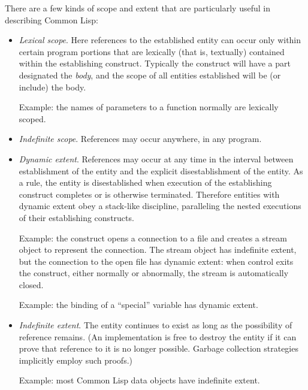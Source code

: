 There are a few kinds of scope and extent that are particularly useful
in describing Common Lisp:
\begin{itemize}
\item
{\it Lexical scope}.  Here references to the established
entity can occur only within certain program portions that are
lexically (that is, textually) contained within the establishing construct.
Typically the construct will have a part designated the {\it body},
and the scope of all entities established will be (or include) the body.

Example: the names of parameters to a function normally are lexically scoped.

\item
{\it Indefinite scope}.  References may occur anywhere, in any program.

\item
{\it Dynamic extent}.  References may occur at any time in the interval
between establishment of the entity and the explicit disestablishment
of the entity.  As a rule, the entity is disestablished when execution
of the establishing construct completes or is otherwise terminated.
Therefore entities with dynamic extent obey a stack-like discipline,
paralleling the nested executions of their establishing constructs.

Example: the  construct opens a connection to a file
and creates a stream object to represent the connection.  The stream object
has indefinite extent, but the connection to the open file has dynamic extent:
when control exits the  construct, either normally
or abnormally, the stream is automatically closed.

Example: the binding of a ``special'' variable has dynamic extent.

\item
{\it Indefinite extent}.  The entity continues to exist as long as the
possibility of reference remains.  (An implementation is free to
destroy the entity if it can prove that reference to it is no longer possible.
Garbage collection strategies implicitly employ such proofs.)

Example: most Common Lisp data objects have indefinite extent.


\end{itemize}
